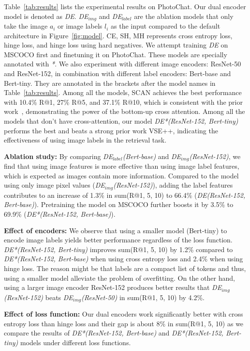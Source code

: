 \documentclass[11pt,a4paper]{article}
\begin{document}
Table~\ref{tab:results} lists the experimental results on PhotoChat. Our dual encoder model is denoted as \textit{DE}. \textit{DE$_{img}$} and \textit{DE$_{label}$} are the ablation models that only take the image $a_i$ or image labels $l_i$ as the input compared to the default architecture in Figure~\ref{fig:model}. 
CE, SH, MH represents cross entropy loss, hinge loss, and hinge loss using hard negatives. We attempt training \textit{DE} on MSCOCO first and finetuning it on PhotoChat. These models are specially annotated with \textit{*}. We also experiment with different image encoders: ResNet-50 and ResNet-152, in combination with different label encoders: Bert-base and Bert-tiny. They are annotated in the brackets after the model names in Table~\ref{tab:results}. 
Among all the models, SCAN achieves the best performance with 10.4\% R@1, 27\% R@5, and 37.1\% R@10, which is consistent with the prior work~\citep{lee2018stacked}, demonstrating the power of the bottom-up cross attention. Among all the models that don't have cross-attention, our model \textit{DE*(ResNet-152, Bert-tiny)} performs the best and beats a strong prior work VSE++, indicating the effectiveness of using image labels in the retrieval task.

\textbf{Ablation study:} By comparing \textit{DE$_{label}$(Bert-base)} and \textit{\textit{DE$_{img}$(ResNet-152)}}, we find that using image features is more effective than using image label features, which is expected as images contain more information. Compared to the model using only image pixel values (\textit{DE$_{img}$(ResNet-152)}), adding the label features contributes to an increase of 1.3\% in sum(R@1, 5, 10) to 66.4\% (\textit{DE(ResNet-152, Bert-base)}). Pretraining the model on MSCOCO further boosts it by 3.5\% to 69.9\% (\textit{DE*(ResNet-152, Bert-base)}).

\textbf{Effect of encoders:} We observe that using a smaller model (Bert-tiny) to encode image labels yields better performance regardless of the loss function. \textit{DE*(ResNet-152, Bert-tiny)} improves sum(R@1, 5, 10) by 1.2\% compared to \textit{DE*(ResNet-152, Bert-base)} when using cross entropy loss and 2.4\% when using hinge loss. The reason might be that labels are a compact list of tokens and thus, using a smaller model alleviate the problem of overfitting. On the other hand, using a larger image encoder ResNet-152 produces better results that \textit{DE$_{img}$(ResNet-152)} beats \textit{DE$_{img}$(ResNet-50)} in sum(R@1, 5, 10) by 4.2\%.

\textbf{Effect of loss function:} Our dual encoders work significantly better with cross entropy loss than hinge loss and their gap is about 8\% in sum(R@1, 5, 10) as we compare the results of \textit{DE*(ResNet-152, Bert-base)} and \textit{DE*(ResNet-152, Bert-tiny)} models under different loss functions.
\end{document}
